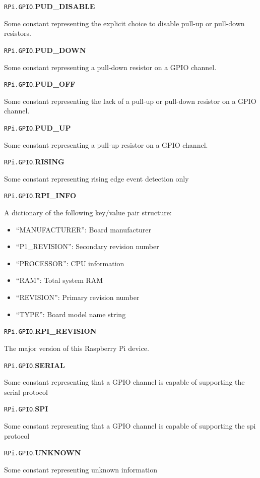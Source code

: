 \documentclass[12pt]{article}
\begin{document}
\noindent \texttt{RPi.GPIO}.\textbf{PUD\_DISABLE}

Some constant representing the explicit choice to disable pull-up or pull-down resistors.

\noindent \texttt{RPi.GPIO}.\textbf{PUD\_DOWN}

Some constant representing a pull-down resistor on a GPIO channel.

\noindent \texttt{RPi.GPIO}.\textbf{PUD\_OFF}

Some constant representing the lack of a pull-up or pull-down resistor on a GPIO channel.

\noindent \texttt{RPi.GPIO}.\textbf{PUD\_UP}

Some constant representing a pull-up resistor on a GPIO channel.

\noindent \texttt{RPi.GPIO}.\textbf{RISING}

Some constant representing rising edge event detection only


\noindent \texttt{RPi.GPIO}.\textbf{RPI\_INFO}

A dictionary of the following key/value pair structure:
\begin{itemize}
    \item ``MANUFACTURER'': Board manufacturer
    \item ``P1\_REVISION'': Secondary revision number
    \item ``PROCESSOR'': CPU information
    \item ``RAM'': Total system RAM
    \item ``REVISION'': Primary revision number
    \item ``TYPE'': Board model name string
\end{itemize}


\noindent \texttt{RPi.GPIO}.\textbf{RPI\_REVISION}

The major version of this Raspberry Pi device.

\noindent \texttt{RPi.GPIO}.\textbf{SERIAL}

Some constant representing that a GPIO channel is capable of supporting the serial protocol


\noindent \texttt{RPi.GPIO}.\textbf{SPI}

Some constant representing that a GPIO channel is capable of supporting the spi protocol

\noindent \texttt{RPi.GPIO}.\textbf{UNKNOWN}

Some constant representing unknown information
\end{document}
